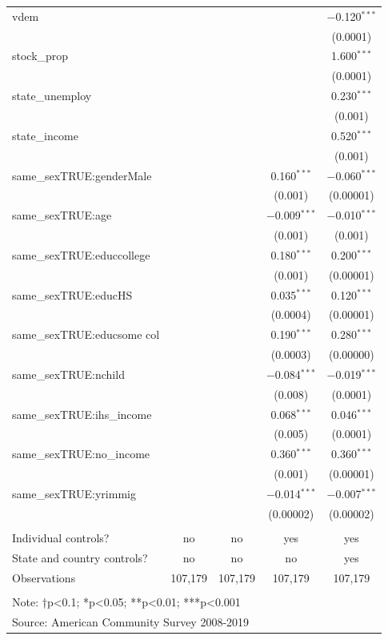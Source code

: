 \documentclass[
  11pt,
]{article}
\begin{document}
\begin{table}[!htbp]
\begin{tabular}{@{\extracolsep{5pt}}lcccc}
  vdem &  &  &  & $-$0.120$^{***}$ \\ 
  &  &  &  & (0.0001) \\ 
  stock\_prop &  &  &  & 1.600$^{***}$ \\ 
  &  &  &  & (0.0001) \\ 
  state\_unemploy &  &  &  & 0.230$^{***}$ \\ 
  &  &  &  & (0.001) \\ 
  state\_income &  &  &  & 0.520$^{***}$ \\ 
  &  &  &  & (0.001) \\ 
  same\_sexTRUE:genderMale &  &  & 0.160$^{***}$ & $-$0.060$^{***}$ \\ 
  &  &  & (0.001) & (0.00001) \\ 
  same\_sexTRUE:age &  &  & $-$0.009$^{***}$ & $-$0.010$^{***}$ \\ 
  &  &  & (0.001) & (0.001) \\ 
  same\_sexTRUE:educcollege &  &  & 0.180$^{***}$ & 0.200$^{***}$ \\ 
  &  &  & (0.001) & (0.00001) \\ 
  same\_sexTRUE:educHS &  &  & 0.035$^{***}$ & 0.120$^{***}$ \\ 
  &  &  & (0.0004) & (0.00001) \\ 
  same\_sexTRUE:educsome col &  &  & 0.190$^{***}$ & 0.280$^{***}$ \\ 
  &  &  & (0.0003) & (0.00000) \\ 
  same\_sexTRUE:nchild &  &  & $-$0.084$^{***}$ & $-$0.019$^{***}$ \\ 
  &  &  & (0.008) & (0.0001) \\ 
  same\_sexTRUE:ihs\_income &  &  & 0.068$^{***}$ & 0.046$^{***}$ \\ 
  &  &  & (0.005) & (0.0001) \\ 
  same\_sexTRUE:no\_income &  &  & 0.360$^{***}$ & 0.360$^{***}$ \\ 
  &  &  & (0.001) & (0.00001) \\ 
  same\_sexTRUE:yrimmig &  &  & $-$0.014$^{***}$ & $-$0.007$^{***}$ \\ 
  &  &  & (0.00002) & (0.00002) \\ 
 \hline \\[-1.8ex] 
Individual controls? & no & no & yes & yes \\ 
State and country controls? & no & no & no & yes \\ 
Observations & 107,179 & 107,179 & 107,179 & 107,179 \\ 
\hline 
\hline \\[-1.8ex] 
\multicolumn{5}{l}{Note: †p<0.1; *p<0.05; **p<0.01; ***p<0.001} \\ 
\multicolumn{5}{l}{Source: American Community Survey 2008-2019} \\ 
\end{tabular} 
\end{table}
\end{document}
